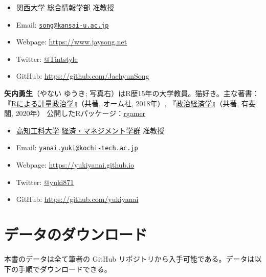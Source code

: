 \documentclass[
  a4paper,
  pandoc,
  ja=standard,
  jafont=haranoaji]{bxjsbook}
\providecommand{\tightlist}{%
  \setlength{\itemsep}{0pt}\setlength{\parskip}{0pt}}
\begin{document}
\begin{itemize}
\tightlist
\item
  \href{https://www.kansai-u.ac.jp/}{関西大学}
  \href{https://www.kansai-u.ac.jp/Fc_inf/}{総合情報学部} 准教授
\item
  Email:
  \href{mailto:song@kansai-u.ac.jp}{\nolinkurl{song@kansai-u.ac.jp}}
\item
  Webpage: \url{https://www.jaysong.net}
\item
  Twitter: \href{https://twitter.com/Tintstyle}{@Tintstyle}
\item
  GitHub: \url{https://github.com/JaehyunSong}
\end{itemize}

\textbf{矢内勇生}（やない ゆうき;
写真右）はR歴15年の大学教員。猫好き。主な著書：『\href{https://github.com/yukiyanai/quant-methods-R}{Rによる計量政治学}』（共著,
オーム社, 2018年）,
『\href{http://www.yuhikaku.co.jp/books/detail/9784641150799}{政治経済学}』（共著,
有斐閣, 2020年）
公開したRパッケージ：\href{https://github.com/yukiyanai/rgamer}{rgamer}

\begin{itemize}
\tightlist
\item
  \href{https://www.kochi-tech.ac.jp/}{高知工科大学}
  \href{https://www.kochi-tech.ac.jp/academics/mng/}{経済・マネジメント学群}
  准教授
\item
  Email:
  \href{mailto:yanai.yuki@kochi-tech.ac.jp}{\nolinkurl{yanai.yuki@kochi-tech.ac.jp}}
\item
  Webpage: \url{https://yukiyanai.github.io}
\item
  Twitter: \href{https://twitter.com/yuki871}{@yuki871}
\item
  GitHub: \url{https://github.com/yukiyanai}
\end{itemize}

\hypertarget{ux30c7ux30fcux30bfux306eux30c0ux30a6ux30f3ux30edux30fcux30c9}{%
\section*{データのダウンロード}\label{ux30c7ux30fcux30bfux306eux30c0ux30a6ux30f3ux30edux30fcux30c9}}

本書のデータは全て筆者の GitHub
リポジトリから入手可能である。データは以下の手順でダウンロードできる。
\end{document}
